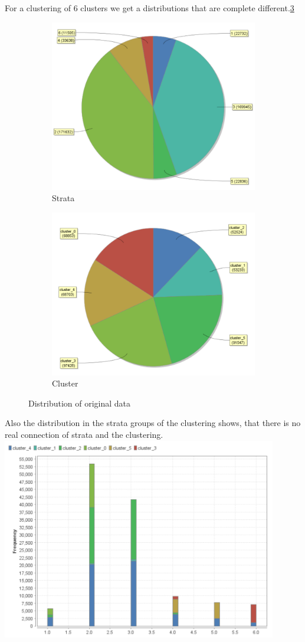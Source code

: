 For a clustering of 6 clusters we get a distributions that are complete different.\ref{fig:OrgDist}
\begin{figure}[h]
\centering
\begin{subfigure}{.5\textwidth}
  \centering
  \includegraphics[width=.4\linewidth]{ClusterOrigRapidStrata.PNG}
  \caption{Strata}
  \label{fig:OrgSt}
\end{subfigure}%
\begin{subfigure}{.5\textwidth}
  \centering
  \includegraphics[width=.4\linewidth]{ClusterOrigRapidCluster.PNG}
  \caption{Cluster}
  \label{fig:OrgCl}
\end{subfigure}
\caption{Distribution of original data}
\label{fig:OrgDist}
\end{figure}

Also the distribution in the strata groups of the clustering shows, that there is no real connection of strata and the clustering.
\includegraphics[width=0.9\textwidth]{ClusterPCAOrigRapidDistribution.PNG}

